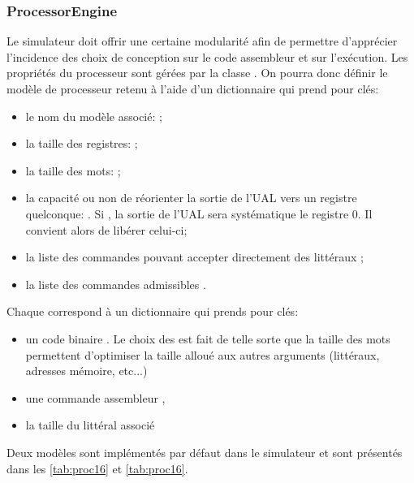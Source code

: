 
\subsubsection{ProcessorEngine}
Le simulateur doit offrir une certaine modularité afin de permettre d'apprécier l'incidence des choix de conception sur le code assembleur et sur l'exécution. Les propriétés du processeur sont gérées par la classe . On pourra donc définir le modèle de processeur retenu à l'aide d'un dictionnaire qui prend pour clés:
\begin{itemize}
	\item le nom du modèle associé: ;
	\item la taille des registres: ;
	\item la taille des mots: ;
	\item la capacité ou non de réorienter la sortie de l'UAL vers un registre quelconque: . Si , la sortie de l'UAL sera systématique le registre 0. Il convient alors de libérer celui-ci; 
	\item la liste des commandes pouvant accepter directement des littéraux ;
	\item la liste des commandes admissibles .
\end{itemize}

Chaque  correspond à un dictionnaire qui prends pour clés:
\begin{itemize}
	\item un code binaire . Le choix des  est fait de telle sorte que la taille des mots permettent d'optimiser la taille alloué aux autres arguments (littéraux, adresses mémoire, etc...)
	\item une commande assembleur ,
	\item la taille du littéral associé	
\end{itemize}

Deux modèles sont implémentés par défaut dans le simulateur et sont présentés dans les \cref{tab:proc16} et \cref{tab:proc16}.


